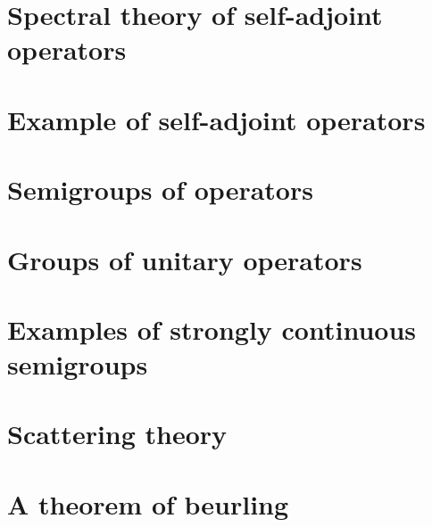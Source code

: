 \documentclass[11pt]{elegantbook}
\begin{document}
\chapter{Spectral theory of self-adjoint operators}

\chapter{Example of self-adjoint operators}

\chapter{Semigroups of operators}

\chapter{Groups of unitary operators}

\chapter{Examples of strongly continuous semigroups}

\chapter{Scattering theory}

\chapter{A theorem of beurling}
\end{document}
